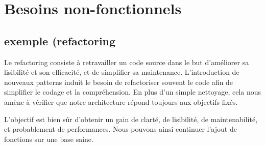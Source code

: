 \section{Besoins non-fonctionnels}

\subsection{exemple (refactoring}\label{refactoring} 

Le refactoring consiste à retravailler un code source dans le but d'améliorer sa lisibilité et son efficacité, et de simplifier sa maintenance.
L'introduction de nouveaux patterns induit le besoin de refactoriser souvent le code afin de simplifier
le codage et la compréhension.
En plus d'un simple nettoyage, cela nous amène à vérifier que notre architecture répond toujours aux
objectifs fixés.

L'objectif est bien sûr d'obtenir un gain de clarté, de lisibilité, de maintenabilité, et probablement de performances. Nous pouvons ainsi continuer l'ajout de fonctions sur une base saine.